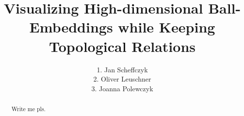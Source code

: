 \documentclass[a4paper, twoside]{report}
\title{Visualizing High-dimensional Ball-Embeddings while Keeping Topological Relations}
\author{1. Jan Scheffczyk \\ 2. Oliver Leuschner \\ 3. Joanna Polewczyk}
\begin{document}


\begin{abstract}
Write me pls.


\end{abstract}


\tableofcontents
\listoffigures











\end{document}
